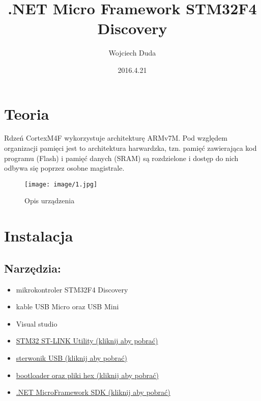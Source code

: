 \documentclass{article}
\title{.NET Micro Framework
STM32F4 Discovery}
\date{2016.4.21}
\author{Wojciech Duda}
\begin{document}
 
\maketitle 
{} 
\newpage
{}
\tableofcontents
\newpage
\section{Teoria}
Rdzeń CortexM4F wykorzystuje architekturę ARMv7M. Pod względem organizacji pamięci jest to architektura harwardzka, tzn. pamięć zawierająca kod programu (Flash) i pamięć danych (SRAM) są rozdzielone i dostęp do nich odbywa się poprzez osobne magistrale.

\begin{figure}[H]
\texttt{[image: image/1.jpg]}
\caption{Opis urządzenia}
\end{figure}
\section{Instalacja}
\subsection{Narzędzia:}
\begin{itemize}
\item mikrokontroler STM32F4 Discovery
\item kable USB Micro oraz USB Mini
\item Visual studio
\item \href{http://www.st.com/content/st_com/en/products/embedded-software/development-tool-software/stsw-link004.html}{STM32 ST-LINK Utility (kliknij aby pobrać)}
\item \href{www.codeplex.com/Download?ProjectName=netmf4stm32&DownloadId=471395}{sterwonik USB (kliknij aby pobrać)}
\item \href{www.codeplex.com/Download?ProjectName=netmf4stm32&DownloadId=471396}{bootloader oraz pliki hex (kliknij aby pobrać)}
\item \href {netmf.codeplex.com/releases/view/91594}{.NET MicroFramework SDK (kliknij aby pobrać)}
\end{itemize}
\end{document}
